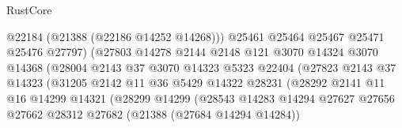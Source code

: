 \begin{lexlean}{RustCore}
\begin{coremodule}
                                        @22184
                                        (@21388 (@22186 @14252 @14268)))
                                      @25461
                                      @25464
                                      @25467
                                      @25471
                                      @25476
                                      @27797)
                                    (@27803
                                      @14278
                                      @2144
                                      @2148
                                      @121
                                      @3070
                                      @14324
                                      @3070
                                      @14368
                                      (@28004
                                        @2143
                                        @37
                                        @3070
                                        @14323
                                        @5323
                                        @22404
                                        (@27823
                                          @2143
                                          @37
                                          @14323
                                          (@31205
                                            @2142
                                            @11
                                            @36
                                            @5429
                                            @14322
                                            @28231
                                            (@28292
                                              @2141
                                              @11
                                              @16
                                              @14299
                                              @14321
                                              (@28299
                                                @14299
                                                (@28543
                                                  @14283
                                                  @14294
                                                  @27627
                                                  @27656
                                                  @27662
                                                  @28312
                                                  @27682
                                                  (@21388 (@27684 @14294 @14284))

\end{coremodule}
\end{lexlean}
